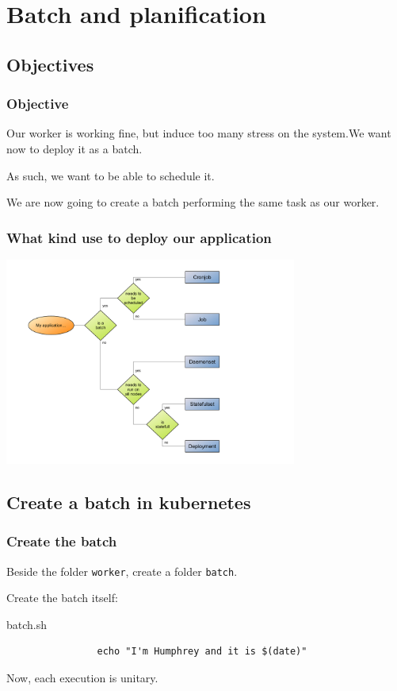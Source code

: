 \section{Batch and planification}

\subsection{Objectives}

	\begin{frame}
		\frametitle{Objective}
		
		Our worker is working fine, but induce too many stress on the system.We want now to deploy it as a batch.
		
		\bigskip
		As such, we want to be able to schedule it.
		
		\bigskip
		We are now going to create a batch performing the same task as our worker.
	\end{frame}

	\begin{frame}
		\frametitle{What kind use to deploy our application}
		
		\begin{center}
		\includegraphics[height=6.8cm]{../../../resources/color/choiceDeploymentType.pdf}
		\end{center}
	\end{frame}
		
\subsection{Create a batch in kubernetes}		
		
	\begin{frame}[fragile]
		\frametitle{Create the batch}
		
		Beside the folder \verb!worker!, create a folder \verb!batch!.
		
		\bigskip
		Create the batch itself:
		\begin{block}{batch.sh}
			\begin{verbatim}
				echo "I'm Humphrey and it is $(date)"
			\end{verbatim}
		\end{block}
		Now, each execution is unitary.
	\end{frame}
	
